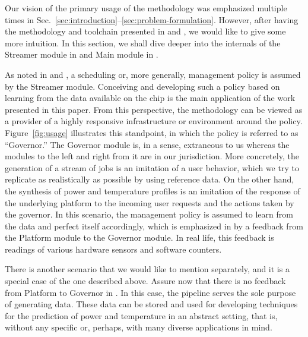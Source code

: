 
Our vision of the primary usage of the methodology was emphasized multiple times
in Sec.~\ref{sec:introduction}--\ref{sec:problem-formulation}. However, after
having the methodology and toolchain presented in  and
, we would like to give some more intuition. In this section, we
shall dive deeper into the internals of the Streamer module in
 and Main module in .

As noted in  and , a scheduling or, more
generally, management policy is assumed by the Streamer module. Conceiving and
developing such a policy based on learning from the data available on the chip
is the main application of the work presented in this paper. From this
perspective, the methodology can be viewed as a provider of a highly responsive
infrastructure or environment around the policy. Figure~\ref{fig:usage}
illustrates this standpoint, in which the policy is referred to as ``Governor.''
The Governor module is, in a sense, extraneous to us whereas the modules to the
left and right from it are in our jurisdiction. More concretely, the generation
of a stream of jobs is an imitation of a user behavior, which we try to
replicate as realistically as possible by using reference data. On the other
hand, the synthesis of power and temperature profiles is an imitation of the
response of the underlying platform to the incoming user requests and the
actions taken by the governor. In this scenario, the management policy is
assumed to learn from the data and perfect itself accordingly, which is
emphasized in  by a feedback from the Platform module to the
Governor module. In real life, this feedback is readings of various hardware
sensors and software counters.

There is another scenario that we would like to mention separately, and it is a
special case of the one described above. Assure now that there is no feedback
from Platform to Governor in . In this case, the pipeline serves the
sole purpose of generating data. These data can be stored and used for
developing techniques for the prediction of power and temperature in an abstract
setting, that is, without any specific or, perhaps, with many diverse
applications in mind.
